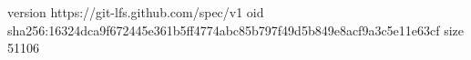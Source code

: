 version https://git-lfs.github.com/spec/v1
oid sha256:16324dca9f672445e361b5ff4774abc85b797f49d5b849e8acf9a3c5e11e63cf
size 51106
